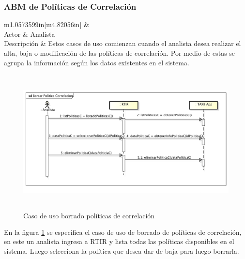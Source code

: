 \subsubsection{ABM de Políticas de Correlación}
\begin{flushleft}
	\tablefirsthead{}
	\tablehead{}
	\tabletail{}
	\tablelasttail{}
	\begin{supertabular}{m{1.0573599in}|m{4.82056in}|}
		 &
		\\\hline
		{Actor} &
		{Analista}\\
		{Descripción} &
		{Estos casos de uso comienzan cuando el analista desea realizar el alta, baja o
			modificación de las políticas de correlación. Por medio de estas se agrupa la información según los datos existentes en
			el sistema.}\\\hhline{~-}
	\end{supertabular}
\end{flushleft}

\bigskip
\begin{figure}[ht!]
	\includegraphics[width=5.7634in,height=2.898in]{Analisis22-img/Analisis22-img020.png}
	\caption{Caso de uso borrado políticas de correlación} 
	\label{fig.borradocorrelacion}
\end{figure}

	En la figura \ref{fig.borradocorrelacion} se especifica el caso de uso de borrado de políticas de correlación, en este un analista ingresa a RTIR y
	lista todas las políticas disponibles en el sistema. Luego selecciona la política que desea dar de baja para luego
	borrarla.


\bigskip


